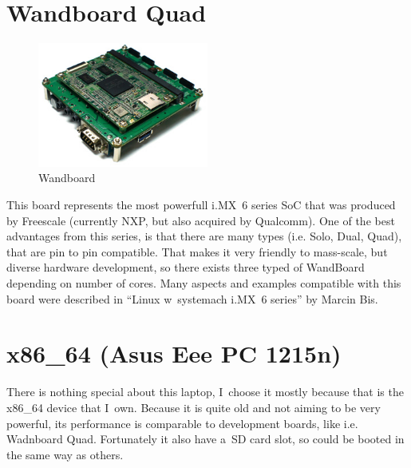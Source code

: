 \documentclass[printmode]{mgr}
\begin{document}
\section{Wandboard Quad}

\begin{figure}[htbp]
  \centering
    \includegraphics[width=0.5\textwidth]{wandboard-front.jpg}
  \caption{Wandboard}
  \label{fig:devboard-wandboard}
\end{figure}

This board represents the most powerfull i.MX~6 series SoC that was produced by Freescale (currently NXP, but also acquired by Qualcomm).
One of the best advantages from this series, is that there are many types (i.e. Solo, Dual, Quad), that are pin to pin compatible.
That makes it very friendly to mass-scale, but diverse hardware development, so there exists three typed of WandBoard depending on number of cores.
Many aspects and examples compatible with this board were described in ``Linux w~systemach i.MX~6 series'' by Marcin Bis.\cite{book:lws-imx6}


\section{x86\_64 (Asus Eee PC 1215n)}

There is nothing special about this laptop, I~choose it mostly because that is the x86\_64 device that I~own. Because it is quite old and not aiming to be very powerful, its performance is comparable to development boards, like i.e. Wadnboard Quad. Fortunately it also have a~SD card slot, so could be booted in the same way as others.
\end{document}
